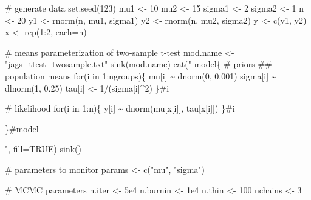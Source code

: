 \documentclass[
  13,
  letterpaper,
]{report}
\newenvironment{Shaded}{\begin{snugshade}}{\end{snugshade}}
\newcommand{\AttributeTok}[1]{\textcolor[rgb]{0.40,0.45,0.13}{#1}}
\newcommand{\CommentTok}[1]{\textcolor[rgb]{0.37,0.37,0.37}{#1}}
\newcommand{\ConstantTok}[1]{\textcolor[rgb]{0.56,0.35,0.01}{#1}}
\newcommand{\DecValTok}[1]{\textcolor[rgb]{0.68,0.00,0.00}{#1}}
\newcommand{\FloatTok}[1]{\textcolor[rgb]{0.68,0.00,0.00}{#1}}
\newcommand{\FunctionTok}[1]{\textcolor[rgb]{0.28,0.35,0.67}{#1}}
\newcommand{\NormalTok}[1]{\textcolor[rgb]{0.00,0.23,0.31}{#1}}
\newcommand{\OtherTok}[1]{\textcolor[rgb]{0.00,0.23,0.31}{#1}}
\newcommand{\SpecialCharTok}[1]{\textcolor[rgb]{0.37,0.37,0.37}{#1}}
\newcommand{\StringTok}[1]{\textcolor[rgb]{0.13,0.47,0.30}{#1}}
\begin{document}
\begin{Shaded}
\begin{Highlighting}[]
\CommentTok{\# generate data}
\FunctionTok{set.seed}\NormalTok{(}\DecValTok{123}\NormalTok{)}
\NormalTok{mu1 }\OtherTok{\textless{}{-}} \DecValTok{10}
\NormalTok{mu2 }\OtherTok{\textless{}{-}} \DecValTok{15}
\NormalTok{sigma1 }\OtherTok{\textless{}{-}} \DecValTok{2}
\NormalTok{sigma2 }\OtherTok{\textless{}{-}} \DecValTok{1}
\NormalTok{n }\OtherTok{\textless{}{-}} \DecValTok{20}
\NormalTok{y1 }\OtherTok{\textless{}{-}} \FunctionTok{rnorm}\NormalTok{(n, mu1, sigma1)}
\NormalTok{y2 }\OtherTok{\textless{}{-}} \FunctionTok{rnorm}\NormalTok{(n, mu2, sigma2)}
\NormalTok{y }\OtherTok{\textless{}{-}} \FunctionTok{c}\NormalTok{(y1, y2)}
\NormalTok{x }\OtherTok{\textless{}{-}} \FunctionTok{rep}\NormalTok{(}\DecValTok{1}\SpecialCharTok{:}\DecValTok{2}\NormalTok{, }\AttributeTok{each=}\NormalTok{n)}

\CommentTok{\# means parameterization of two{-}sample t{-}test}
\NormalTok{mod.name }\OtherTok{\textless{}{-}} \StringTok{"jags\_ttest\_twosample.txt"}
\FunctionTok{sink}\NormalTok{(mod.name)}
\FunctionTok{cat}\NormalTok{(}\StringTok{"}
\StringTok{    model\{}
\StringTok{        \# priors}
\StringTok{        \#\# population means}
\StringTok{        for(i in 1:ngroups)\{}
\StringTok{            mu[i] \textasciitilde{} dnorm(0, 0.001)}
\StringTok{            sigma[i] \textasciitilde{} dlnorm(1, 0.25)}
\StringTok{            tau[i] \textless{}{-} 1/(sigma[i]\^{}2)}
\StringTok{        \}\#i}

\StringTok{        \# likelihood}
\StringTok{        for(i in 1:n)\{}
\StringTok{            y[i] \textasciitilde{} dnorm(mu[x[i]], tau[x[i]])}
\StringTok{        \}\#i}

\StringTok{    \}\#model}

\StringTok{"}\NormalTok{, }\AttributeTok{fill=}\ConstantTok{TRUE}\NormalTok{)}
\FunctionTok{sink}\NormalTok{()}

\CommentTok{\# parameters to monitor}
\NormalTok{params }\OtherTok{\textless{}{-}} \FunctionTok{c}\NormalTok{(}\StringTok{"mu"}\NormalTok{, }\StringTok{"sigma"}\NormalTok{)}

\CommentTok{\# MCMC parameters}
\NormalTok{n.iter }\OtherTok{\textless{}{-}} \FloatTok{5e4}
\NormalTok{n.burnin }\OtherTok{\textless{}{-}} \FloatTok{1e4}
\NormalTok{n.thin }\OtherTok{\textless{}{-}} \DecValTok{100}
\NormalTok{nchains }\OtherTok{\textless{}{-}} \DecValTok{3}


\end{Highlighting}
\end{Shaded}
\end{document}
